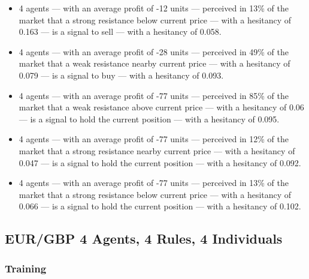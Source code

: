 {\small
  \begin{itemize}
  \item 4 agents — with an average profit of -12 units — perceived in 13\% of
    the market that a strong resistance below current price — with a hesitancy
    of 0.163 — is a signal to sell — with a hesitancy of 0.058.
  \item 4 agents — with an average profit of -28 units — perceived in 49\% of
    the market that a weak resistance nearby current price — with a hesitancy of
    0.079 — is a signal to buy — with a hesitancy of 0.093.
  \item 4 agents — with an average profit of -77 units — perceived in 85\% of
    the market that a weak resistance above current price — with a hesitancy of
    0.06 — is a signal to hold the current position — with a hesitancy of 0.095.
  \item 4 agents — with an average profit of -77 units — perceived in 12\% of
    the market that a strong resistance nearby current price — with a hesitancy
    of 0.047 — is a signal to hold the current position — with a hesitancy of
    0.092.
  \item 4 agents — with an average profit of -77 units — perceived in 13\% of
    the market that a strong resistance below current price — with a hesitancy
    of 0.066 — is a signal to hold the current position — with a hesitancy of
    0.102.
  \end{itemize}
}



\subsection{EUR/GBP 4 Agents, 4 Rules, 4 Individuals}
\label{}

\subsubsection{Training}
\label{}

